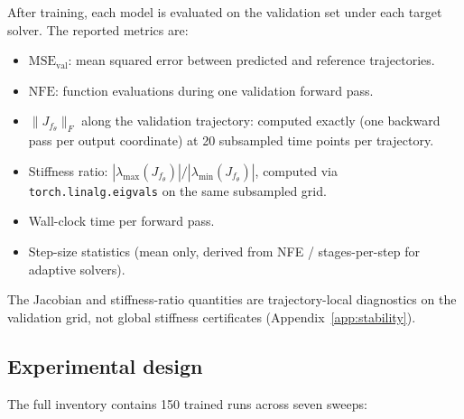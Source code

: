 \documentclass[11pt]{article}
\theoremstyle{plain}
\theoremstyle{definition}
\newcommand{\fjac}{J_{f_\theta}}
\newcommand{\NFE}{\mathrm{NFE}}
\begin{document}
After training, each model is evaluated on the validation set under each
target solver. The reported metrics are:
\begin{itemize}[leftmargin=2em]
\item $\mathrm{MSE}_\text{val}$: mean squared error between predicted and
  reference trajectories.
\item $\NFE$: function evaluations during one validation forward pass.
\item $\|\fjac\|_F$ along the validation trajectory: computed exactly (one
  backward pass per output coordinate) at 20 subsampled time points per
  trajectory.
\item Stiffness ratio: $|\lambda_\text{max}(\fjac)|/|\lambda_\text{min}(\fjac)|$,
  computed via \texttt{torch.linalg.eigvals} on the same subsampled grid.
\item Wall-clock time per forward pass.
\item Step-size statistics (mean only, derived from NFE / stages-per-step for
  adaptive solvers).
\end{itemize}
The Jacobian and stiffness-ratio quantities are trajectory-local diagnostics
on the validation grid, not global stiffness certificates
(Appendix~\ref{app:stability}).

\subsection{Experimental design}
\label{sec:design}

The full inventory contains 150 trained runs across seven sweeps:
\end{document}
